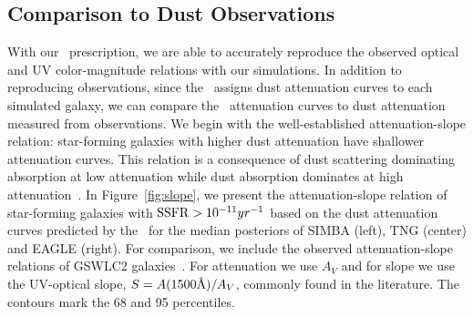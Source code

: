 \subsection{Comparison to Dust Observations} \label{sec:reproduce}
With our \eda~prescription, we are able to accurately reproduce the
observed optical and UV color-magnitude relations with our simulations. 
In addition to  reproducing observations, since the \eda~assigns dust
attenuation curves to each simulated galaxy, we can compare the
\eda~attenuation curves to dust attenuation measured from
observations. 
We begin with the well-established attenuation-slope relation: star-forming
galaxies with higher dust attenuation have shallower attenuation curves. 
This relation is a consequence of dust scattering dominating absorption at
low attenuation while dust absorption dominates at high
attenuation~\citep{gordon1994, witt2000, draine2003, chevallard2013}. 
In Figure~\ref{fig:slope}, we present the attenuation-slope relation of
star-forming galaxies with ${\rm SSFR} > 10^{-11}yr^{-1}$ based on the
dust attenuation curves predicted by the \eda~for the median posteriors of
SIMBA (left), TNG (center) and EAGLE (right).
For comparison, we include the observed attenuation-slope relations of
GSWLC2 galaxies~\citep[grey shaded;][]{salim2020}.
For attenuation we use $A_V$ and for slope we use the UV-optical slope, $S
= A(1500\AA)/A_V$, commonly found in the literature. 
The contours mark the 68 and 95 percentiles. 


